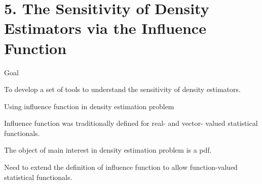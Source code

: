 \documentclass[aspectratio=169,xcolor=dvipsnames]{beamer}
\newcommand{\SM}{\mathrm{SM}}
\begin{document}


\section{5. The Sensitivity of Density Estimators via the Influence Function}

%


\begin{frame}{Goal}
	
	
	To develop a set of tools to understand the sensitivity of density estimators. 
	
\end{frame}


%	
%	
%	


\begin{frame}{Using influence function in density estimation problem}
	
	Influence function \parencite{Hampel1968-gm} was traditionally defined for {\color{red} real- and vector- valued} statistical functionals. 
	
	\vspace{5pt}
	
	The object of main interest in density estimation problem is a pdf. 
	
	\vspace{5pt}
	
	Need to extend the definition of influence function to allow {\color{red} function-valued} statistical functionals. 
	
\end{frame}
\end{document}
